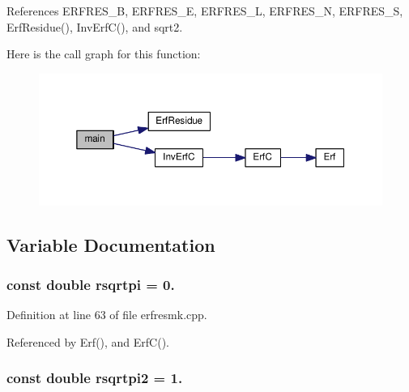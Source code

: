 References E\-R\-F\-R\-E\-S\-\_\-\-B, E\-R\-F\-R\-E\-S\-\_\-\-E, E\-R\-F\-R\-E\-S\-\_\-\-L, E\-R\-F\-R\-E\-S\-\_\-\-N, E\-R\-F\-R\-E\-S\-\_\-\-S, Erf\-Residue(), Inv\-Erf\-C(), and sqrt2.



Here is the call graph for this function\-:\nopagebreak
\begin{figure}[H]
\begin{center}
\leavevmode
\includegraphics[width=350pt]{toolboxes_2rnd_2erfresmk_8cpp_ae66f6b31b5ad750f1fe042a706a4e3d4_cgraph}
\end{center}
\end{figure}




\subsection{Variable Documentation}
\subsubsection[{rsqrtpi}]{\setlength{\rightskip}{0pt plus 5cm}const double rsqrtpi = 0.\hspace{0.3cm}{\ttfamily [static]}}\label{toolboxes_2rnd_2erfresmk_8cpp_a5d77540ba72d2896426a602d0608ae08}


Definition at line 63 of file erfresmk.\-cpp.



Referenced by Erf(), and Erf\-C().

\subsubsection[{rsqrtpi2}]{\setlength{\rightskip}{0pt plus 5cm}const double rsqrtpi2 = 1.\hspace{0.3cm}{\ttfamily [static]}}\label{toolboxes_2rnd_2erfresmk_8cpp_ad6ff57468381393a5aa6b6a666ec09bf}


